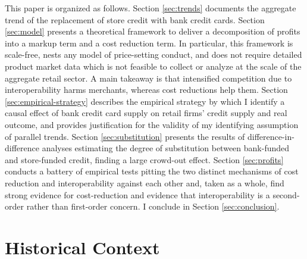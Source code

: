 \documentclass[12pt,english]{article}
\begin{document}
This paper is organized as follows. Section \ref{sec:trends} documents the aggregate trend of the replacement of store credit with bank credit cards. Section \ref{sec:model} presents a theoretical framework to deliver a decomposition of profits into a markup term and a cost reduction term. In particular, this framework is scale-free, nests any model of price-setting conduct, and does not require detailed product market data which is not feasible to collect or analyze at the scale of the aggregate retail sector. A main takeaway is that intensified competition due to interoperability harms merchants, whereas cost reductions help them. Section \ref{sec:empirical-strategy} describes the empirical strategy by which I identify a causal effect of bank credit card supply on retail firms' credit supply and real outcome, and provides justification for the validity of my identifying assumption of parallel trends. Section \ref{sec:substitution} presents the results of difference-in-difference analyses estimating the degree of substitution between bank-funded and store-funded credit, finding a large crowd-out effect. Section \ref{sec:profits} conducts a battery of empirical tests pitting the two distinct mechanisms of cost reduction and interoperability against each other and, taken as a whole, find strong evidence for cost-reduction and evidence that interoperability is a second-order rather than first-order concern. I conclude in Section \ref{sec:conclusion}. 

\section{Historical Context}\label{sec:history}
\end{document}

